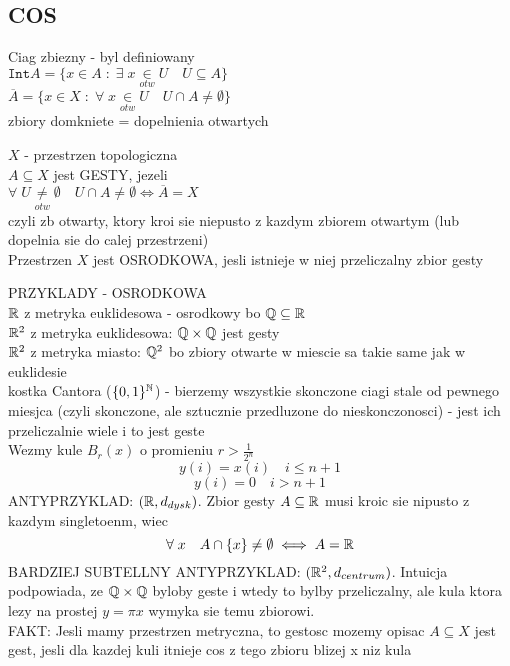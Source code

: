 \documentclass{article}
\begin{document}
\subsection*{COS}
    Ciag zbiezny - byl definiowany\\
    $\texttt{Int}A= \{x\in A\;:\;\exists\;x\underset{otw}\in U\quad U\subseteq A\}$\\
    $\overline{A}=\{x\in X\;:\;\forall\;x\underset{otw}\in U\quad U\cap A\neq \emptyset\}$\\
    zbiory domkniete = dopelnienia otwartych
    \begin{center}
        $X$ - przestrzen topologiczna\medskip\\
        $A\subseteq X$ jest GESTY, jezeli\smallskip\\
        $\forall\; U\underset{otw}\neq\emptyset\quad U\cap A\neq \emptyset\iff \overline{A}=X$\smallskip\\
        czyli zb otwarty, ktory kroi sie niepusto z kazdym zbiorem otwartym (lub dopelnia sie do calej przestrzeni)\bigskip\\
        Przestrzen $X$ jest OSRODKOWA, jesli istnieje w niej przeliczalny zbior gesty
    \end{center}\bigskip
    PRZYKLADY - OSRODKOWA\medskip\\
    $\mathbb{R}$ z metryka euklidesowa - osrodkowy bo $\mathbb{Q}\subseteq \mathbb{R}$\medskip\\
    $\mathbb{R}^2$ z metryka euklidesowa: $\mathbb{Q}\times \mathbb{Q}$ jest gesty\medskip\\
    $\mathbb{R}^2$ z metryka miasto: $\mathbb{Q}^2$ bo zbiory otwarte w miescie sa takie same jak w euklidesie\medskip\\
    kostka Cantora ($\{0,1\}^{\mathbb{N}}$) - bierzemy wszystkie skonczone ciagi stale od pewnego miesjca (czyli skonczone, ale sztucznie przedluzone do nieskonczonosci) - jest ich przeliczalnie wiele i to jest geste\\
    Wezmy kule $B_r(x)$ o promieniu $r>\frac1{2^n}$
    $$y(i)=x(i)\quad i\leq n+1$$
    $$y(i)=0 \quad i>n+1$$
    ANTYPRZYKLAD: $(\mathbb{R}, d_{dysk})$. Zbior gesty $A\subseteq \mathbb{R}$ musi kroic sie nipusto z kazdym singletoenm, wiec
    $$\forall\;x\quad A\cap \{x\}\neq\emptyset\iff A=\mathbb{R}$$
    BARDZIEJ SUBTELLNY ANTYPRZYKLAD: $(\mathbb{R}^2, d_{centrum})$. Intuicja podpowiada, ze $\mathbb{Q}\times\mathbb{Q}$ byloby geste i wtedy to bylby przeliczalny, ale kula ktora lezy na prostej $y=\pi x$ wymyka sie temu zbiorowi.\\
    FAKT: Jesli mamy przestrzen metryczna, to gestosc mozemy opisac $A\subseteq X$ jest gest, jesli dla kazdej kuli itnieje cos z tego zbioru blizej x niz kula
\end{document}
